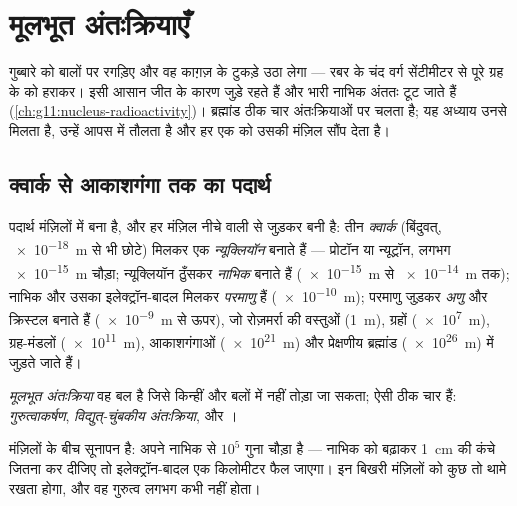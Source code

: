 \chapter{मूलभूत अंतःक्रियाएँ}\label{ch:g11:fundamental-interactions}

गुब्बारे को बालों पर रगड़िए और वह काग़ज़ के टुकड़े उठा लेगा --- रबर के चंद
वर्ग सेंटीमीटर से पूरे ग्रह के  को हराकर। इसी आसान जीत के कारण
 जुड़े रहते हैं और भारी नाभिक अंततः टूट जाते हैं (\cref{ch:g11:nucleus-radioactivity})।
ब्रह्मांड ठीक चार अंतःक्रियाओं पर चलता है; यह अध्याय उनसे मिलता है, उन्हें
आपस में तौलता है और हर एक को उसकी मंज़िल सौंप देता है।

\section{क्वार्क से आकाशगंगा तक का पदार्थ}

\begin{definition}[संरचना की सीढ़ी]\label{def:g11:fundamental-interactions:ladder}
पदार्थ मंज़िलों में बना है, और हर मंज़िल नीचे वाली से जुड़कर बनी है: तीन
\emph{क्वार्क} (बिंदुवत्, \qty{e-18}{m} से भी छोटे) मिलकर एक
\emph{न्यूक्लियॉन} बनाते हैं --- प्रोटॉन या न्यूट्रॉन,
लगभग \qty{e-15}{m} चौड़ा; न्यूक्लियॉन ठुँसकर \emph{नाभिक} बनाते हैं
(\qty{e-15}{m} से \qty{e-14}{m} तक); नाभिक और उसका इलेक्ट्रॉन-बादल मिलकर
\emph{परमाणु} हैं (\qty{e-10}{m}); परमाणु जुड़कर
\emph{अणु} और क्रिस्टल बनाते हैं (\qty{e-9}{m} से ऊपर), जो रोज़मर्रा की
वस्तुओं (\qty{1}{m}), ग्रहों (\qty{e7}{m}), ग्रह-मंडलों (\qty{e11}{m}), आकाशगंगाओं
(\qty{e21}{m}) और प्रेक्षणीय ब्रह्मांड (\qty{e26}{m}) में जुड़ते जाते हैं।
\end{definition}

\begin{definition}[चार अंतःक्रियाएँ]\label{def:g11:fundamental-interactions:four}
\emph{मूलभूत अंतःक्रिया} वह बल है जिसे
किन्हीं और बलों में नहीं तोड़ा जा सकता; ऐसी ठीक चार हैं:
\emph{गुरुत्वाकर्षण}, \emph{विद्युत्-चुंबकीय
अंतःक्रिया},  और
।
\end{definition}

\begin{remark}\label{rem:g11:fundamental-interactions:empty}
मंज़िलों के बीच सूनापन है:  अपने नाभिक से $10^{5}$ गुना
चौड़ा है --- नाभिक को बढ़ाकर \qty{1}{cm} की कंचे जितना कर दीजिए तो
इलेक्ट्रॉन-बादल एक किलोमीटर फैल जाएगा। इन बिखरी मंज़िलों को कुछ तो थामे रखता
होगा, और वह गुरुत्व लगभग कभी नहीं होता।
\end{remark}

